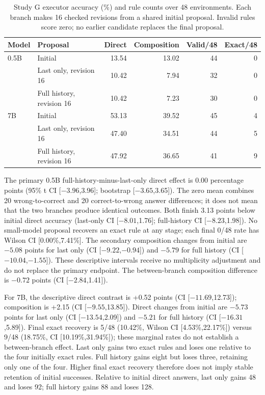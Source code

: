 \documentclass[11pt]{article}
\begin{document}
\begin{table}[htbp]
\centering\small
\begin{tabular}{llrrrr}
\toprule
Model & Proposal & Direct & Composition & Valid/48 & Exact/48 \\
\midrule
0.5B & Initial & 13.54 & 13.02 & 44 & 0 \\
& Last only, revision 16 & 10.42 & 7.94 & 32 & 0 \\
& Full history, revision 16 & 10.42 & 7.23 & 30 & 0 \\
7B & Initial & 53.13 & 39.52 & 45 & 4 \\
& Last only, revision 16 & 47.40 & 34.51 & 44 & 5 \\
& Full history, revision 16 & 47.92 & 36.65 & 41 & 9 \\
\bottomrule
\end{tabular}
\caption{Study G executor accuracy (\%) and rule counts over 48 environments.
Each branch makes 16 checked revisions from a shared initial proposal.
Invalid rules score zero; no earlier candidate replaces the final proposal.}
\label{tab:g}
\end{table}

The primary 0.5B full-history-minus-last-only direct effect is 0.00 percentage
points (95\% t CI [$-3.96$,3.96]; bootstrap [$-3.65$,3.65]). The zero mean
combines 20 wrong-to-correct and 20 correct-to-wrong answer differences;
it does not mean that the two branches produce identical outcomes. Both finish
3.13 points below initial direct accuracy (last-only CI [$-8.01$,1.76];
full-history CI [$-8.23$,1.98]). No small-model proposal recovers an exact
rule at any stage; each final 0/48 rate has Wilson CI [0.00\%,7.41\%].
The secondary composition changes from initial are $-5.08$ points for last
only (CI [$-9.22$,$-0.94$]) and $-5.79$ for full history
(CI [$-10.04$,$-1.55$]). These descriptive intervals receive no multiplicity
adjustment and do not replace the primary endpoint. The between-branch
composition difference is $-0.72$ points (CI [$-2.84$,1.41]).

For 7B, the descriptive direct contrast is +0.52 points
(CI [$-11.69$,12.73]); composition is +2.15 (CI [$-9.55$,13.85]).
Direct changes from initial are $-5.73$ points for last only
(CI [$-13.54$,2.09]) and $-5.21$ for full history (CI [$-16.31$,5.89]).
Final exact recovery is 5/48 (10.42\%, Wilson CI [4.53\%,22.17\%]) versus
9/48 (18.75\%, CI [10.19\%,31.94\%]); these marginal rates do not establish
a between-branch effect. Last only gains two exact rules and loses one
relative to the four initially exact rules. Full history gains eight but
loses three, retaining only one of the four. Higher final exact recovery
therefore does not imply stable retention of initial successes. Relative to
initial direct answers, last only gains 48 and loses 92; full history gains
88 and loses 128.
\end{document}
